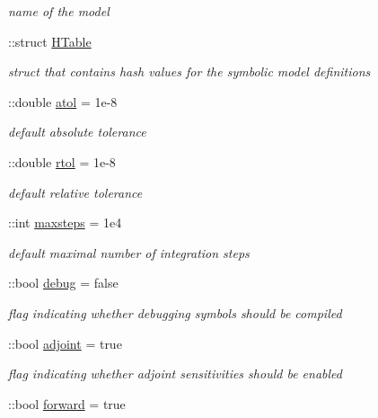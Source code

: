 \begin{DoxyCompactItemize}
\begin{DoxyCompactList}\small\item\em name of the model \end{DoxyCompactList}\item 
\hypertarget{classamimodel_aafe6335df413dd688a2f44efba012cf1}{}\+::struct \hyperlink{classamimodel_aafe6335df413dd688a2f44efba012cf1}{H\+Table}\label{classamimodel_aafe6335df413dd688a2f44efba012cf1}

\begin{DoxyCompactList}\small\item\em struct that contains hash values for the symbolic model definitions \end{DoxyCompactList}\item 
\+::double \hyperlink{classamimodel_a0c5f3dcf809a17b895fe12fc91272349}{atol} = 1e-\/8
\begin{DoxyCompactList}\small\item\em default absolute tolerance \end{DoxyCompactList}\item 
\+::double \hyperlink{classamimodel_a7978e9a4674f869e6b2950e2f6262ca5}{rtol} = 1e-\/8
\begin{DoxyCompactList}\small\item\em default relative tolerance \end{DoxyCompactList}\item 
\+::int \hyperlink{classamimodel_ac37622882dacee1f11688d4941ccb45e}{maxsteps} = 1e4
\begin{DoxyCompactList}\small\item\em default maximal number of integration steps \end{DoxyCompactList}\item 
\+::bool \hyperlink{classamimodel_a0514aabed091ee5e2f35766eb01eced6}{debug} = false
\begin{DoxyCompactList}\small\item\em flag indicating whether debugging symbols should be compiled \end{DoxyCompactList}\item 
\+::bool \hyperlink{classamimodel_ab6d500b41cf50693452415caca31d32e}{adjoint} = true
\begin{DoxyCompactList}\small\item\em flag indicating whether adjoint sensitivities should be enabled \end{DoxyCompactList}\item 
\+::bool \hyperlink{classamimodel_a81e42e48c9c72814166c8f7cd414ce24}{forward} = true

\end{DoxyCompactItemize}
